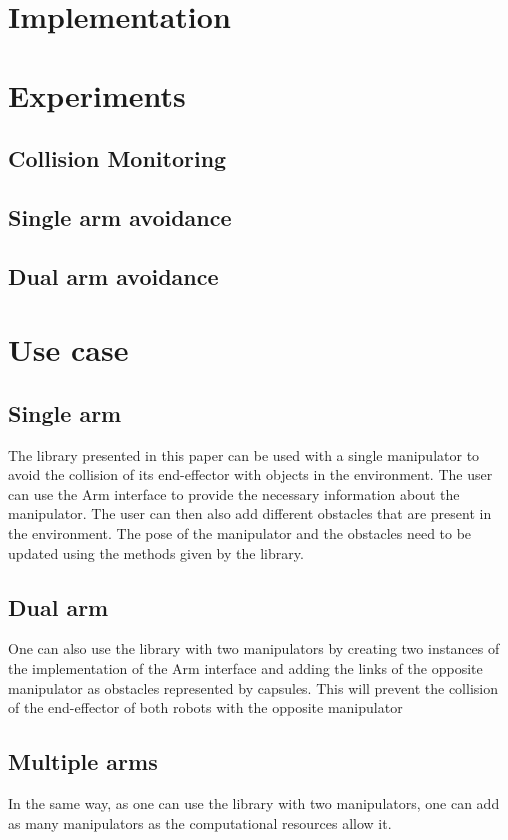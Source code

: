 \documentclass[a4paper, 10pt, conference]{ieeeconf}      %
\begin{document}
\section{Implementation} %

\section{Experiments}

\subsection{Collision Monitoring} %

\subsection{Single arm avoidance} %

\subsection{Dual arm avoidance} %


\section{Use case}

\subsection{Single arm} %
The library presented in this paper can be used with a single manipulator to avoid the collision of its end-effector with objects in the environment.
The user can use the Arm interface to provide the necessary information about the manipulator.
The user can then also add different obstacles that are present in the environment.
The pose of the manipulator and the obstacles need to be updated using the methods given by the library.
\subsection{Dual arm} %
One can also use the library with two manipulators by creating two instances of the implementation of the Arm interface and adding the links of 
the opposite manipulator as obstacles represented by capsules.
This will prevent the collision of the end-effector of both robots with the opposite manipulator
\subsection{Multiple arms}
In the same way, as one can use the library with two manipulators, one can add as many manipulators as the computational resources allow it.
\end{document}
